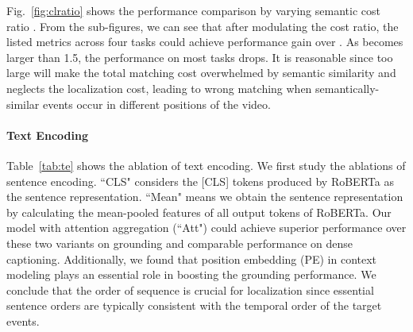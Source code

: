 Fig.~\ref{fig:clratio} shows the performance comparison by varying semantic cost ratio . From the sub-figures, we can see that after modulating the cost ratio, the listed metrics across four tasks could achieve performance gain over . As  becomes larger than 1.5, the performance on most tasks drops. It is reasonable since too large  will make the total matching cost overwhelmed by semantic similarity and neglects the localization cost, leading to wrong matching when semantically-similar events occur in different positions of the video.  


\begin{table}[]
\caption{Ablation studies of text encoding.}
\vspace{-0.5em}
\small
\renewcommand\arraystretch{1.0}
\centering
        \makeatletter{}\makeatother
\label{tab:te}
\vspace{-1.0em}
\end{table}

\vspace{-1.0em}
\paragraph{\textbf{Text Encoding}}

Table~\ref{tab:te} shows the ablation of text encoding. We first study the ablations of sentence encoding. ``CLS" considers the [CLS] tokens produced by RoBERTa as the sentence representation. ``Mean" means we obtain the sentence representation by calculating the mean-pooled features of all output tokens of RoBERTa. Our model with attention aggregation (``Att") could achieve superior performance over these two variants on grounding and comparable performance on dense captioning. Additionally, we found that position embedding (PE) in context modeling plays an essential role in boosting the grounding performance. We conclude that the order of sequence is crucial for localization since essential sentence orders are typically consistent with the temporal order of the target events.

